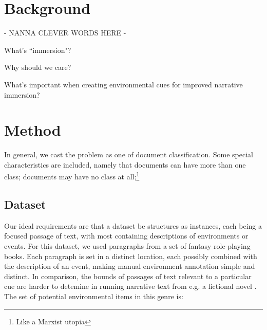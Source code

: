 \documentclass[11pt]{article}
\begin{document}
\section{Background}

- NANNA CLEVER WORDS HERE - 

What's ``immersion"?

Why should we care?

What's important when creating environmental cues for improved narrative immersion?

\section{Method}

In general, we cast the problem as one of document classification.
Some special characteristics are included, namely that documents can have more than one class; documents may have no class at all;\footnote{Like a Marxist utopia} 

\subsection{Dataset}
Our ideal requirements are that a dataset be structures as instances, each being a focused passage of text, with most containing descriptions of environments or events.
For this dataset, we used paragraphs from a set of fantasy role-playing books.%
Each paragraph is set in a distinct location, each possibly combined with the description of an event, making manual environment annotation simple and distinct.
In comparison, the bounds of passages of text relevant to a particular cue are harder to detemine in running narrative text from e.g. a fictional novel .
The set of potential environmental items in this genre is:

\end{document}
